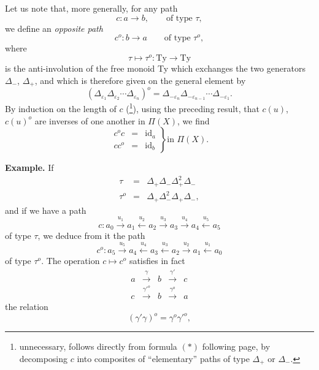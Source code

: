 \documentclass[11pt]{article}
\newcommand{\printedpage}[1]{\marginpar{\footnotesize p.~#1}}
\newcommand{\msp}[1]{\marginpar{\footnotesize [#1]}}
\begin{document}
\printedpage{43}
\msp{page 64}
Let us note that, more generally, for any path
\[
c : a \longrightarrow b, \qquad \text{of type } \tau,
\]
we define an \textit{opposite path}
\[
c^o : b \longrightarrow a \qquad \text{of type } \tau^o,
\]
where
\[
\tau \longmapsto \tau^o : \mathrm{Ty} \longrightarrow \mathrm{Ty}
\]
is the anti-involution of the free monoid Ty which exchanges the two generators $\Delta_-$, $\Delta_+$, and which is therefore given on the general element by
\[
(\Delta_{\varepsilon_1}\Delta_{\varepsilon_2}\cdots\Delta_{\varepsilon_n})^o = \Delta_{-\varepsilon_n}\Delta_{-\varepsilon_{n-1}}\cdots\Delta_{-\varepsilon_1}.
\]
By induction on the length of $c$ (\footnote[18]{unnecessary, follows directly from formula $(*)$ following page, by decomposing $c$ into composites of ``elementary'' paths of type $\Delta_+$ or $\Delta_-$.}), using the preceding result, that $c(u)$, $c(u)^o$ are inverses of one another in $\Pi(X)$, we find
\[
\left.
\begin{array}{rcl}
c^o c & = & \mathrm{id}_a\\
c c^o & = & \mathrm{id}_b
\end{array}
\right\}\text{in } \Pi(X).
\]

\textbf{Example.} If
\[
\begin{array}{rcl}
\tau & = & \Delta_+\Delta_-\Delta_+^2\Delta_-\\
\tau^o & = & \Delta_+\Delta_-^2\Delta_+\Delta_-,
\end{array}
\]
and if we have a path
\[
c : a_0 \xrightarrow{u_1} a_1 \xleftarrow{u_2} a_2 \xrightarrow{u_3} a_3 \xrightarrow{u_4} a_4 \xleftarrow{u_5} a_5
\]
of type $\tau$, we deduce from it the path
\[
c^o : a_5 \xrightarrow{u_5} a_4 \xleftarrow{u_4} a_3 \xleftarrow{u_3} a_2 \xrightarrow{u_2} a_1 \xleftarrow{u_1} a_0
\]
of type $\tau^o$. The operation $c \longmapsto c^o$ satisfies in
\msp{page 65}
fact
\[
\begin{array}{ccccc}
a & \xrightarrow{\gamma} & b & \xrightarrow{\gamma'} & c\\
c & \xrightarrow{\gamma'^o} & b & \xrightarrow{\gamma^o} & a
\end{array}
\]
the relation
\[
(\gamma'\gamma)^o = \gamma^o\gamma'^o, \tag*{$(*)$}
\]
\end{document}
